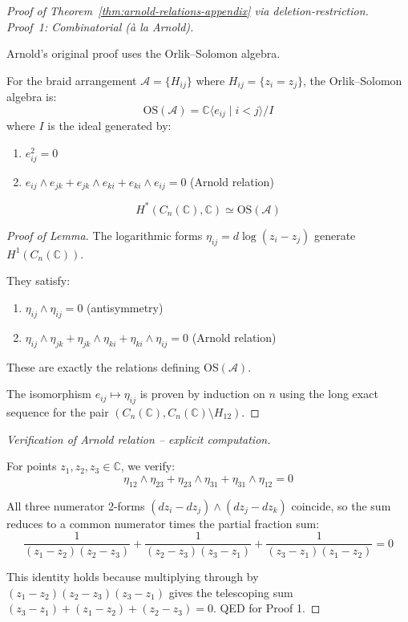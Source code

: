 \begin{proof}[Proof of Theorem~\ref{thm:arnold-relations-appendix} via deletion-restriction]

\emph{Proof~1: Combinatorial (\`a la Arnold).}

Arnold's original proof \cite{Arnold69} uses the Orlik--Solomon algebra.

\begin{definition}\label{def:orlik-solomon-arnold}
For the braid arrangement $\mathcal{A} = \{H_{ij}\}$ where $H_{ij} = \{z_i = z_j\}$, 
the Orlik--Solomon algebra is:
\[\text{OS}(\mathcal{A}) = \mathbb{C}\langle e_{ij} \mid i < j \rangle / I\]
where $I$ is the ideal generated by:
\begin{enumerate}
\item $e_{ij}^2 = 0$
\item $e_{ij} \wedge e_{jk} + e_{jk} \wedge e_{ki} + e_{ki} \wedge e_{ij} = 0$ (Arnold relation)
\end{enumerate}
\end{definition}

\begin{lemma}\label{lem:OS-cohomology-arnold}
\[H^*(C_n(\mathbb{C}), \mathbb{C}) \simeq \text{OS}(\mathcal{A})\]
\end{lemma}

\begin{proof}[Proof of Lemma]
The logarithmic forms $\eta_{ij} = d\log(z_i - z_j)$ generate $H^1(C_n(\mathbb{C}))$.

They satisfy:
\begin{enumerate}
\item $\eta_{ij} \wedge \eta_{ij} = 0$ (antisymmetry)
\item $\eta_{ij} \wedge \eta_{jk} + \eta_{jk} \wedge \eta_{ki} + \eta_{ki} \wedge \eta_{ij} = 0$ 
(Arnold relation)
\end{enumerate}

These are exactly the relations defining OS$(\mathcal{A})$.

The isomorphism $e_{ij} \mapsto \eta_{ij}$ is proven by induction on $n$ using the 
long exact sequence for the pair $(C_n(\mathbb{C}), C_n(\mathbb{C}) \setminus H_{12})$.
\end{proof}

\emph{Verification of Arnold relation -- explicit computation.}

For points $z_1, z_2, z_3 \in \mathbb{C}$, we verify:
\[\eta_{12} \wedge \eta_{23} + \eta_{23} \wedge \eta_{31} + \eta_{31} \wedge \eta_{12} = 0\]

All three numerator 2-forms $(dz_i - dz_j) \wedge (dz_j - dz_k)$ coincide,
so the sum reduces to a common numerator times the partial fraction sum:
\[\frac{1}{(z_1-z_2)(z_2-z_3)} + \frac{1}{(z_2-z_3)(z_3-z_1)} + \frac{1}{(z_3-z_1)(z_1-z_2)} = 0\]

This identity holds because multiplying through by $(z_1-z_2)(z_2-z_3)(z_3-z_1)$ gives
the telescoping sum $(z_3-z_1) + (z_1-z_2) + (z_2-z_3) = 0$.  QED for Proof 1.

\end{proof}

